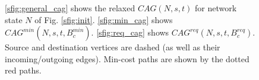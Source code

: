 \documentclass[journal]{IEEEtran}
\begin{document}
\begin{figure} [t]
{{
 }
}

\caption{\ref{sfig:general_cag} shows the relaxed $CAG(N, s, t)$ for network state $N$ of Fig. \ref{sfig:init}. \ref{sfig:min_cag} shows $CAG^{min}(N, s, t, B^{min}_{c})$. \ref{sfig:req_cag} shows $CAG^{req}(N, s, t, B^{req}_{c})$. Source and destination vertices are dashed (as well as their incoming/outgoing edges). Min-cost paths are shown by the dotted red paths.}
\label{fig:cag_examples}
\end{figure}
\end{document}
